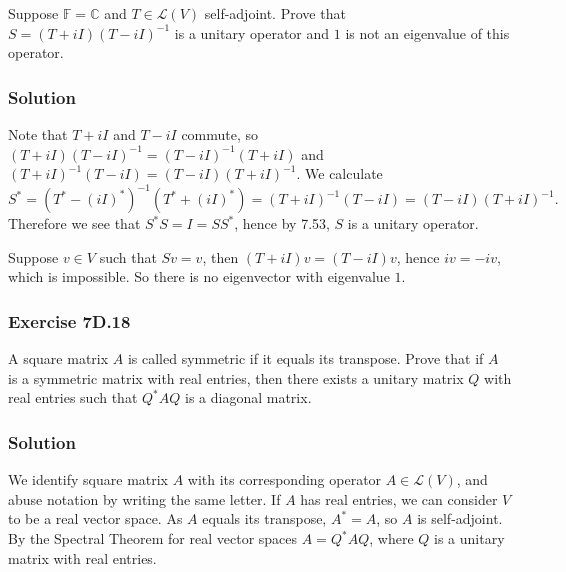 Suppose $\mathbb{F} = \mathbb{C}$ and $T \in \mathcal{L}(V)$ self-adjoint.
Prove that $S = (T + iI)(T - iI)^{-1}$ is a unitary operator and $1$ is not an eigenvalue of this operator.

\subsubsection*{Solution}

Note that $T + iI$ and $T - iI$ commute, so $(T + iI)(T - iI)^{-1} = (T - iI)^{-1}(T + iI)$ and $(T + iI)^{-1}(T - iI) = (T - iI)(T + iI)^{-1}$.
We calculate
\begin{equation*}
    S^*
        = (T^* - (iI)^*)^{-1} (T^* + (iI)^*)
        = (T + iI)^{-1} (T - iI)
        = (T - iI) (T + iI)^{-1}.
\end{equation*}
Therefore we see that $S^*S = I = SS^*$, hence by 7.53, $S$ is a unitary operator.

Suppose $v \in V$ such that $Sv = v$, then $(T + iI)v = (T - iI)v$, hence $iv = -iv$, which is impossible.
So there is no eigenvector with eigenvalue $1$.


\subsubsection*{Exercise 7D.18}

A square matrix $A$ is called symmetric if it equals its transpose.
Prove that if $A$ is a symmetric matrix with real entries, then there exists a unitary matrix $Q$ with real entries such that $Q^*AQ$ is a diagonal matrix.

\subsubsection*{Solution}

We identify square matrix $A$ with its corresponding operator $A \in \mathcal{L}(V)$, and abuse notation by writing the same letter.
If $A$ has real entries, we can consider $V$ to be a real vector space.
As $A$ equals its transpose, $A^* = A$, so $A$ is self-adjoint.
By the Spectral Theorem for real vector spaces $A = Q^*AQ$, where $Q$ is a unitary matrix with real entries.
